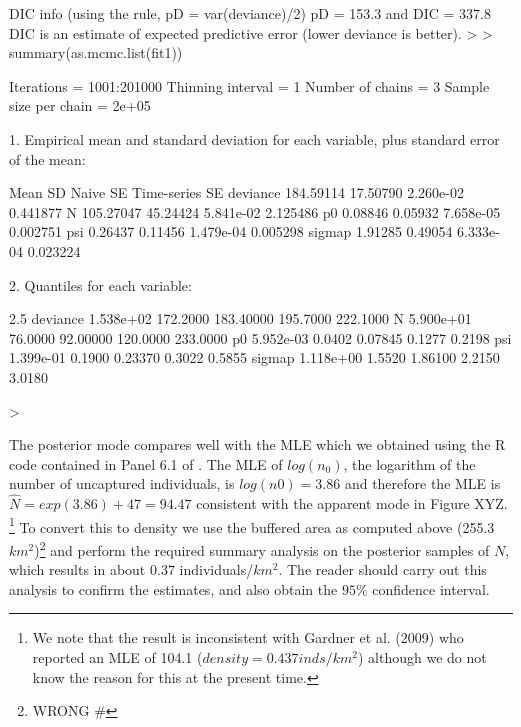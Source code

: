 DIC info (using the rule, pD = var(deviance)/2)
pD = 153.3 and DIC = 337.8
DIC is an estimate of expected predictive error (lower deviance is better).
> 
> summary(as.mcmc.list(fit1))

Iterations = 1001:201000
Thinning interval = 1 
Number of chains = 3 
Sample size per chain = 2e+05 

1. Empirical mean and standard deviation for each variable,
   plus standard error of the mean:

              Mean       SD  Naive SE Time-series SE
deviance 184.59114 17.50790 2.260e-02       0.441877
N        105.27047 45.24424 5.841e-02       2.125486
p0         0.08846  0.05932 7.658e-05       0.002751
psi        0.26437  0.11456 1.479e-04       0.005298
sigmap     1.91285  0.49054 6.333e-04       0.023224

2. Quantiles for each variable:

              2.5%
deviance 1.538e+02 172.2000 183.40000 195.7000 222.1000
N        5.900e+01  76.0000  92.00000 120.0000 233.0000
p0       5.952e-03   0.0402   0.07845   0.1277   0.2198
psi      1.399e-01   0.1900   0.23370   0.3022   0.5855
sigmap   1.118e+00   1.5520   1.86100   2.2150   3.0180

> 






The posterior mode compares well with the MLE which we obtained using
the R code contained in Panel 6.1 of \citet{royle_dorazio:2008}.  The
MLE of $log(n_{0})$, the logarithm of the number of uncaptured
individuals, is $log(n0) = 3.86$ and therefore the MLE is $\hat{N} =
exp(3.86)+47 = 94.47$ consistent with the apparent mode in Figure XYZ.
\footnote{We note that the result is inconsistent with Gardner et
  al. (2009) who reported an MLE of 104.1 ($density = 0.437
  inds/km^2$) although we do not know the reason for this at the
  present time.}  To convert this to density we use the buffered area
as computed above (255.3 $km^2$)\footnote{WRONG \#} and perform the
required summary analysis on the posterior samples of $N$, which
results in about $0.37$ individuals/$km^2$. The reader should carry
out this analysis to confirm the estimates, and also obtain the $95\%$
confidence interval.





